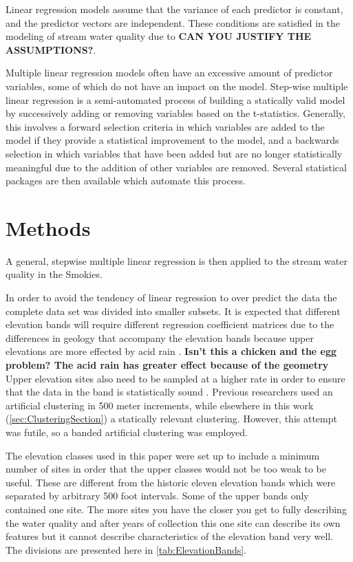 Linear regression models assume that the variance of each predictor is constant, and the predictor vectors are independent.
These conditions are satisfied in the modeling of stream water quality due to \textbf{CAN YOU JUSTIFY THE ASSUMPTIONS?}.

Multiple linear regression models often have an excessive amount of predictor variables, some of which do not have an impact on the model.
Step-wise multiple linear regression is a semi-automated process of building a statically valid model by successively adding or removing variables based on the t-statistics.
Generally, this involves a forward selection criteria in which variables are added to the model if they provide a statistical improvement to the model, and a backwards selection in which variables that have been added but are no longer statistically meaningful due to the addition of other variables are removed.
Several statistical packages are then available which automate this process.


\section{Methods}
\label{sec:TAMethods}

A general, stepwise multiple linear regression is then applied to the stream water quality in the Smokies.

In order to avoid the tendency of linear regression to over predict the data the complete data set was divided into smaller subsets.
It is expected that different elevation bands will require different regression coefficient matrices due to the differences in geology that accompany the elevation bands because upper elevations are more effected by acid rain \citep{weathers2006}. 
\textbf{Isn't this a chicken and the egg problem? The acid rain has  greater effect because of the geometry}
Upper elevation sites also need to be sampled at a higher rate in order to ensure that the data in the band is statistically sound  \citep{weathers2006}.
Previous researchers used an artificial clustering in 500 meter increments, while elsewhere in this work (\autoref{sec:ClusteringSection}) a statically relevant clustering.
However, this attempt was futile, so a banded artificial clustering was employed.

The elevation classes used in this paper were set up to include a minimum number of sites in order that the upper classes would not be too weak to be useful. 
These are different from the historic eleven elevation bands which were separated by arbitrary 500 foot intervals. Some of the upper bands only contained one site. 
The more sites you have the closer you get to fully describing the water quality and after years of collection this one site can describe its own features but it cannot describe characteristics of the elevation band very well. 
The divisions are presented here in \autoref{tab:ElevationBands}.




